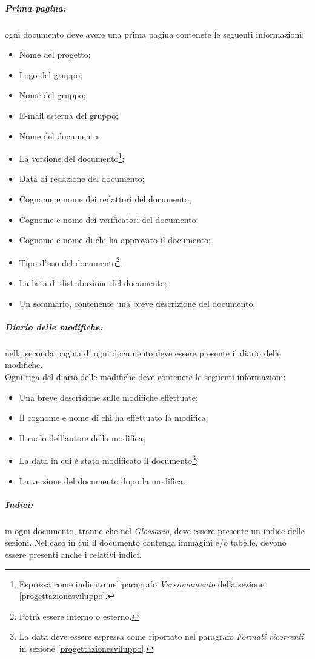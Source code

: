 \subparagraph{Prima pagina:}
ogni documento deve avere una prima pagina contenete le seguenti informazioni:
\begin{itemize}
\item Nome del progetto;
\item Logo del gruppo;
\item Nome del gruppo;
\item E-mail esterna del gruppo;
\item Nome del documento;
\item La versione del documento\footnote{Espressa come indicato nel paragrafo \textit{Versionamento} della sezione \ref{progettazionesviluppo}.};
\item Data di redazione del documento;
\item Cognome e nome dei redattori del documento;
\item Cognome e nome dei verificatori del documento;
\item Cognome e nome di chi ha approvato il documento;
\item Tipo d'uso del documento\footnote{Potrà essere interno o esterno.};
\item La lista di distribuzione del documento;
\item Un sommario, contenente una breve descrizione del documento.
\end{itemize}

\subparagraph{Diario delle modifiche:}
nella seconda pagina di ogni documento deve essere presente il diario delle modifiche.
\\Ogni riga del diario delle modifiche deve contenere le seguenti informazioni:
\begin{itemize}
\item Una breve descrizione sulle modifiche effettuate;
\item Il cognome e nome di chi ha effettuato la modifica;
\item Il ruolo dell'autore della modifica;
\item La data in cui è stato modificato il documento\footnote{La data deve essere espressa come riportato nel paragrafo \textit{Formati ricorrenti} in sezione \ref{progettazionesviluppo}.};
\item La versione del documento dopo la modifica.
\end{itemize}

\subparagraph{Indici:}
in ogni documento, tranne che nel \emph{Glossario}, deve essere presente un indice delle sezioni. Nel caso in cui il documento contenga immagini e/o tabelle, devono essere presenti anche i relativi indici.

